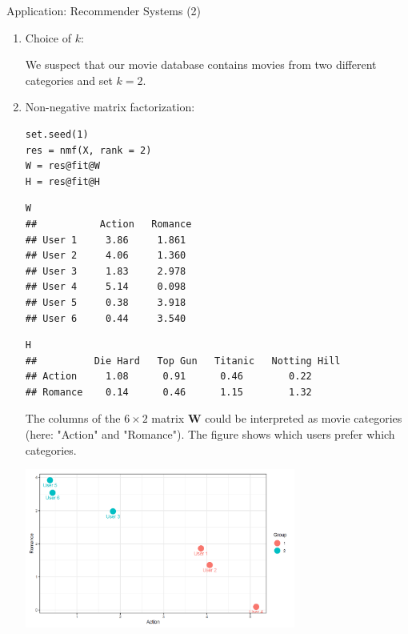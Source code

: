 \documentclass[11pt,compress,t,notes=noshow, xcolor=table]{beamer}
\begin{document}
\begin{vbframe}{Application: Recommender Systems (2)}
\begin{enumerate}
\item Choice of $k$:

\lz

We suspect that our movie database contains movies from two different categories and set $k=2$.

\lz

\item Non-negative matrix factorization:
\vspace{0.3cm}
\footnotesize

\begin{verbatim}
set.seed(1)
res = nmf(X, rank = 2)
W = res@fit@W
H = res@fit@H
\end{verbatim}


\framebreak







\begin{verbatim}
W
##           Action   Romance
## User 1     3.86     1.861
## User 2     4.06     1.360
## User 3     1.83     2.978
## User 4     5.14     0.098
## User 5     0.38     3.918
## User 6     0.44     3.540
\end{verbatim}

\lz 

\begin{verbatim}
H
##          Die Hard   Top Gun   Titanic   Notting Hill
## Action     1.08      0.91      0.46        0.22
## Romance    0.14      0.46      1.15        1.32
\end{verbatim}

\framebreak

\normalsize
The columns of the $6 \times 2$ matrix $\mathbf{W}$ could be interpreted as movie categories (here: "Action" and "Romance"). The figure shows which users prefer which categories.

\lz

\begin{center}
	\includegraphics[width = 0.7\textwidth]{figure_man/recom-system-1.png}
\end{center}


\end{enumerate}
\end{vbframe}
\end{document}
